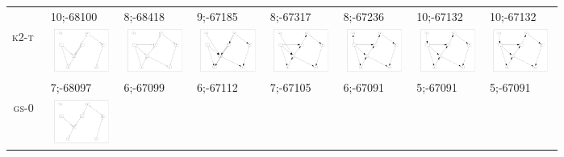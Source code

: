 \begin{table}[!p]
\begin{tabular}{r@{}p{2.0cm}@{}p{2.0cm}@{}p{2.0cm}@{}p{2.0cm}@{}p{2.0cm}@{}p{2.0cm}@{}p{2.0cm}}
& 10;-68100 & 8;-68418 & 9;-67185 & 8;-67317 & 8;-67236 & 10;-67132 & 10;-67132\\
\textsc{k2-t~} &
\includegraphics[width=20.3mm, height=14.25mm]{fig/11-Sep-2003-14-47-35-dag-asia250-K2-MSWT-RES} &
\includegraphics[width=20.3mm, height=14.25mm]{fig/11-Aug-2003-14-59-43-dag-asia500-K2-MSWT-RES} &
\includegraphics[width=20.3mm, height=14.25mm]{fig/11-Mar-2003-18-46-18-dag-asia1000-K2-MSWT-RES} &
\includegraphics[width=20.3mm, height=14.25mm]{fig/11-Mar-2003-18-46-18-dag-asia2000-K2-MSWT-RES} &
\includegraphics[width=20.3mm, height=14.25mm]{fig/11-Mar-2003-18-46-18-dag-asia5000-K2-MSWT-RES} &
\includegraphics[width=20.3mm, height=14.25mm]{fig/11-Mar-2003-18-46-18-dag-asia10000-K2-MSWT-RES} &
\includegraphics[width=20.3mm, height=14.25mm]{fig/11-Mar-2003-18-46-18-dag-asia15000-K2-MSWT-RES} \\
& 7;-68097 & 6;-67099 & 6;-67112 & 7;-67105 & 6;-67091 & 5;-67091 & 5;-67091\\
\textsc{gs-0~} &
\includegraphics[width=20.3mm, height=14.25mm]{fig/11-Sep-2003-14-39-38-dag-asia250-GS-RES} &

\end{tabular}
\end{table}
